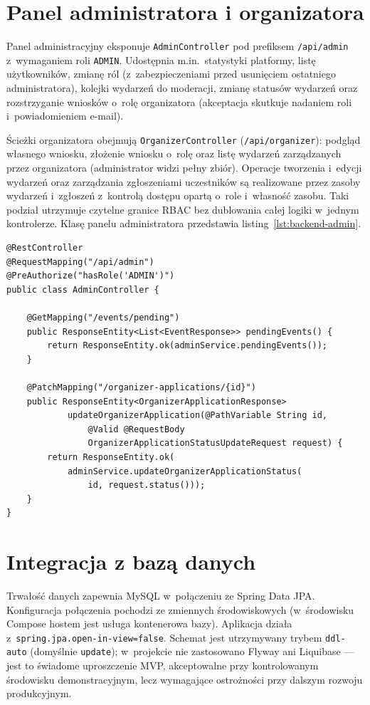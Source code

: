 \documentclass{sprz}
\begin{document}
\section{Panel administratora i organizatora}
Panel administracyjny eksponuje \texttt{AdminController} pod prefiksem \texttt{/api/admin} z~wymaganiem roli \texttt{ADMIN}. Udostępnia m.in.\ statystyki platformy, listę użytkowników, zmianę ról (z~zabezpieczeniami przed usunięciem ostatniego administratora), kolejki wydarzeń do moderacji, zmianę statusów wydarzeń oraz rozstrzyganie wniosków o~rolę organizatora (akceptacja skutkuje nadaniem roli i~powiadomieniem e-mail).

Ścieżki organizatora obejmują \texttt{OrganizerController} (\texttt{/api/organizer}): podgląd własnego wniosku, złożenie wniosku o~rolę oraz listę wydarzeń zarządzanych przez organizatora (administrator widzi pełny zbiór). Operacje tworzenia i~edycji wydarzeń oraz zarządzania zgłoszeniami uczestników są realizowane przez zasoby wydarzeń i~zgłoszeń z~kontrolą dostępu opartą o~role i~własność zasobu. Taki podział utrzymuje czytelne granice RBAC bez dublowania całej logiki w~jednym kontrolerze. Klasę panelu administratora przedstawia listing~\ref{lst:backend-admin}.

\begin{lstlisting}[caption={Panel administratora --- RBAC na poziomie klasy},label={lst:backend-admin}]
@RestController
@RequestMapping("/api/admin")
@PreAuthorize("hasRole('ADMIN')")
public class AdminController {

    @GetMapping("/events/pending")
    public ResponseEntity<List<EventResponse>> pendingEvents() {
        return ResponseEntity.ok(adminService.pendingEvents());
    }

    @PatchMapping("/organizer-applications/{id}")
    public ResponseEntity<OrganizerApplicationResponse>
            updateOrganizerApplication(@PathVariable String id,
                @Valid @RequestBody
                OrganizerApplicationStatusUpdateRequest request) {
        return ResponseEntity.ok(
            adminService.updateOrganizerApplicationStatus(
                id, request.status()));
    }
}
\end{lstlisting}

\section{Integracja z bazą danych}
Trwałość danych zapewnia MySQL w~połączeniu ze Spring Data JPA. Konfiguracja połączenia pochodzi ze zmiennych środowiskowych (w~środowisku Compose hostem jest usługa kontenerowa bazy). Aplikacja działa z~\texttt{spring.jpa.open-in-view=false}. Schemat jest utrzymywany trybem \texttt{ddl-auto} (domyślnie \texttt{update}); w~projekcie nie zastosowano Flyway ani Liquibase --- jest to świadome uproszczenie MVP, akceptowalne przy kontrolowanym środowisku demonstracyjnym, lecz wymagające ostrożności przy dalszym rozwoju produkcyjnym.
\end{document}
